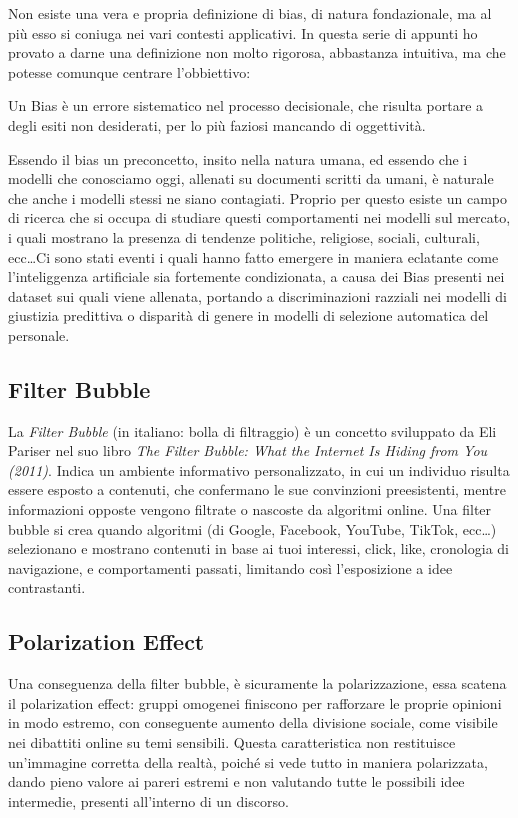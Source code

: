 Non esiste una vera e propria definizione di bias, di natura fondazionale, ma al più esso si coniuga nei vari contesti applicativi. In questa serie di appunti ho provato a darne una definizione non molto rigorosa, abbastanza intuitiva, ma che potesse comunque centrare l'obbiettivo:

\begin{Definizione}
    Un Bias è un errore sistematico nel processo decisionale, che risulta portare a degli esiti non desiderati, per lo più faziosi mancando di oggettività.
\end{Definizione}

Essendo il bias un preconcetto, insito nella natura umana, ed essendo che i modelli che conosciamo oggi, allenati su documenti scritti da umani, è naturale che anche i modelli stessi ne siano contagiati. Proprio per questo esiste un campo di ricerca che si occupa di studiare questi comportamenti nei modelli sul mercato, i quali mostrano la presenza di tendenze politiche, religiose, sociali, culturali, ecc\ldots Ci sono stati eventi i quali hanno fatto emergere in maniera eclatante come l'inteliggenza artificiale sia fortemente condizionata, a causa dei Bias presenti nei dataset sui quali viene allenata, portando a discriminazioni razziali nei modelli di giustizia predittiva o disparità di genere in modelli di selezione automatica del personale.

\subsection{Filter Bubble}
La \textit{Filter Bubble} (in italiano: bolla di filtraggio) è un concetto sviluppato da Eli Pariser nel suo libro \textit{The Filter Bubble: What the Internet Is Hiding from You (2011)}. Indica un ambiente informativo personalizzato, in cui un individuo risulta essere esposto a contenuti, che confermano le sue convinzioni preesistenti, mentre informazioni opposte vengono filtrate o nascoste da algoritmi online. Una filter bubble si crea quando algoritmi (di Google, Facebook, YouTube, TikTok, ecc\dots) selezionano e mostrano contenuti in base ai tuoi interessi, click, like, cronologia di navigazione, e comportamenti passati, limitando così l’esposizione a idee contrastanti.

\subsection{Polarization Effect}

Una conseguenza della filter bubble, è sicuramente la polarizzazione, essa scatena il polarization effect: gruppi omogenei finiscono per rafforzare le proprie opinioni in modo estremo, con conseguente aumento della divisione sociale, come visibile nei dibattiti online su temi sensibili. Questa caratteristica non restituisce un'immagine corretta della realtà, poiché si vede tutto in maniera polarizzata, dando pieno valore ai pareri estremi e non valutando tutte le possibili idee intermedie, presenti all'interno di un discorso.

